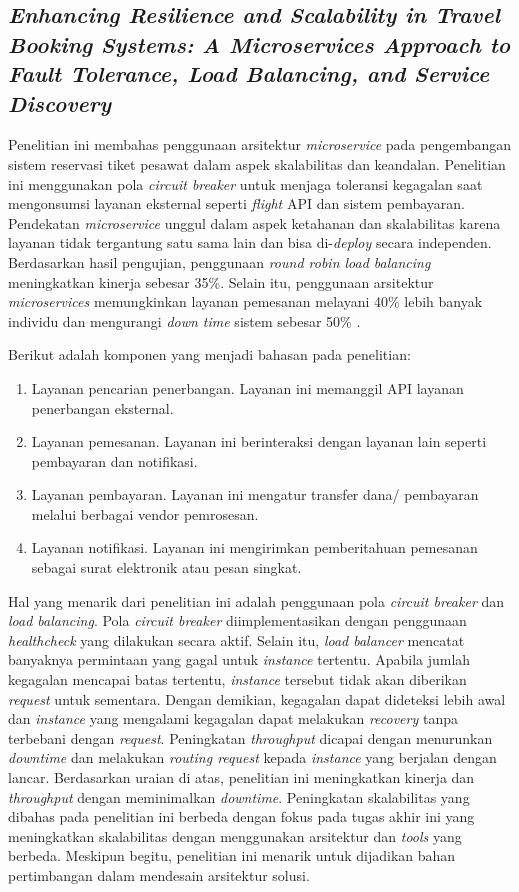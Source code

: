 \subsection{\textit{Enhancing Resilience and Scalability in Travel Booking Systems: A Microservices Approach to Fault Tolerance, Load Balancing, and Service Discovery}}

Penelitian ini membahas penggunaan arsitektur \textit{microservice} pada pengembangan sistem reservasi tiket pesawat dalam aspek skalabilitas dan keandalan. Penelitian ini menggunakan pola \textit{circuit breaker} untuk menjaga toleransi kegagalan saat mengonsumsi layanan eksternal seperti \textit{flight} API dan sistem pembayaran. Pendekatan \textit{microservice} unggul dalam aspek ketahanan dan skalabilitas karena layanan tidak tergantung satu sama lain dan bisa di-\textit{deploy} secara independen. Berdasarkan hasil pengujian, penggunaan \textit{round robin load balancing} meningkatkan kinerja sebesar 35\%. Selain itu, penggunaan arsitektur \textit{microservices} memungkinkan layanan pemesanan melayani 40\% lebih banyak individu dan mengurangi \textit{down time} sistem sebesar 50\% \parencite{barua2024enhancingresiliencescalabilitytravel}.

Berikut adalah komponen yang menjadi bahasan pada penelitian:

\begin{enumerate}
    \item Layanan pencarian penerbangan. Layanan ini memanggil API layanan penerbangan eksternal.
    \item Layanan pemesanan. Layanan ini berinteraksi dengan layanan lain seperti pembayaran dan notifikasi.
    \item Layanan pembayaran. Layanan ini mengatur transfer dana/ pembayaran melalui berbagai vendor pemrosesan.
    \item Layanan notifikasi. Layanan ini mengirimkan pemberitahuan pemesanan sebagai surat elektronik atau pesan singkat.
\end{enumerate}

Hal yang menarik dari penelitian ini adalah penggunaan pola \textit{circuit breaker} dan \textit{load balancing}. Pola \textit{circuit breaker} diimplementasikan dengan penggunaan \textit{healthcheck} yang dilakukan secara aktif. Selain itu, \textit{load balancer} mencatat banyaknya permintaan yang gagal untuk \textit{instance} tertentu. Apabila jumlah kegagalan mencapai batas tertentu, \textit{instance} tersebut tidak akan diberikan \textit{request} untuk sementara. Dengan demikian, kegagalan dapat dideteksi lebih awal dan \textit{instance} yang mengalami kegagalan dapat melakukan \textit{recovery} tanpa terbebani dengan \textit{request}. Peningkatan \textit{throughput} dicapai dengan menurunkan \textit{downtime} dan melakukan \textit{routing request} kepada \textit{instance} yang berjalan dengan lancar. Berdasarkan uraian di atas, penelitian ini meningkatkan kinerja dan \textit{throughput} dengan meminimalkan \textit{downtime}. Peningkatan skalabilitas yang dibahas pada penelitian ini berbeda dengan fokus pada tugas akhir ini yang meningkatkan skalabilitas dengan menggunakan arsitektur dan \textit{tools} yang berbeda. Meskipun begitu, penelitian ini menarik untuk dijadikan bahan pertimbangan dalam mendesain arsitektur solusi.